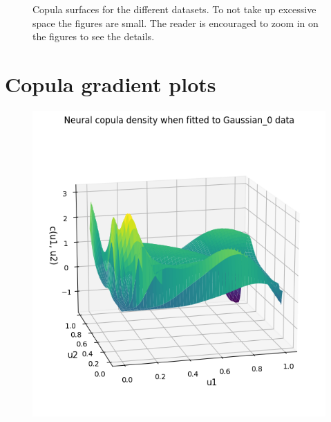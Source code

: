 \documentclass[%
a4paper,							
11pt,								
bibliography=totoc,						
abstracton=true					
]
{scrartcl}
\theoremstyle{plain}
\theoremstyle{definition}
\theoremstyle{remark}
\newcommand{\1}{\mathbbm{1}}
\begin{document}
\begin{figure}[H]
    \caption{Copula surfaces for the different datasets. To not take up excessive space the figures are small. The reader is encouraged to zoom in on the figures to see the details.}
    \label{fig:NeuralCopulaSurface}
\end{figure}



\newpage
\section{Copula gradient plots}\label{sec:CopulaGradientsPlots}
\begin{figure}[H]
    \centering
    \begin{minipage}{0.49\textwidth}
        \centering
        \includegraphics[width=\textwidth]{5ResultsDiscussion/pictures/PortfolioTest/GradPort1.png}
    \end{minipage}
    \hfill
    \begin{minipage}{0.49\textwidth}
        \centering

\end{minipage}
\end{figure}
\end{document}
